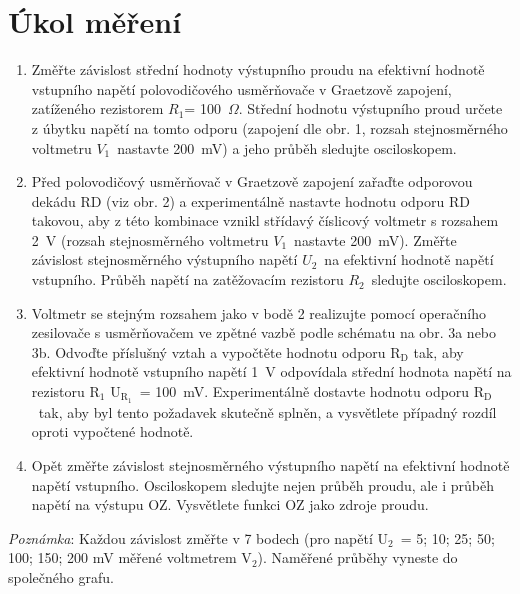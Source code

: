 \documentclass[a4paper,12pt]{article}   %
\newcommand{\tsub}[1]{$_\textrm{#1}$}
\newcommand{\tohm}{$\Omega$}
\newcommand{\ri}{$R_1$}
\newcommand{\rii}{$R_2$}
\newcommand{\uii}{$U_2$}
\newcommand{\vii}{$V_1$}
\begin{document}
\section{Úkol měření}
\label{zadani}
\begin{enumerate}
    \item Změřte závislost střední hodnoty výstupního proudu na efektivní hodnotě vstupního napětí polovodičového usměrňovače v Graetzově zapojení, zatíženého rezistorem \ri = 100~\tohm. Střední hodnotu výstupního proud určete z úbytku napětí na tomto odporu (zapojení dle obr. 1, rozsah stejnosměrného voltmetru \vii~nastavte 200~mV) a jeho průběh sledujte osciloskopem.
    \item Před polovodičový usměrňovač v Graetzově zapojení zařaďte odporovou dekádu RD (viz obr. 2) a experimentálně nastavte hodnotu odporu RD takovou, aby z této kombinace vznikl střídavý číslicový voltmetr s rozsahem 2~V (rozsah stejnosměrného voltmetru \vii~nastavte 200~mV). Změřte závislost stejnosměrného výstupního napětí \uii~na efektivní hodnotě napětí vstupního. Průběh napětí na zatěžovacím rezistoru \rii~sledujte osciloskopem.
    \item Voltmetr se stejným rozsahem jako v bodě 2 realizujte pomocí operačního zesilovače s usměrňovačem ve zpětné vazbě podle schématu na obr. 3a nebo 3b. Odvoďte příslušný vztah a vypočtěte hodnotu odporu R\tsub{D} tak, aby efektivní hodnotě vstupního napětí 1~V odpovídala střední hodnota napětí na rezistoru R\tsub{1} U\tsub{R\tsub{1}}~= 100~mV. Experimentálně dostavte hodnotu odporu R\tsub{D}~tak, aby byl tento požadavek skutečně splněn, a vysvětlete případný rozdíl oproti vypočtené hodnotě.
    \item Opět změřte závislost stejnosměrného výstupního napětí na efektivní hodnotě napětí vstupního. Osciloskopem sledujte nejen průběh proudu, ale i průběh napětí na výstupu OZ. Vysvětlete funkci OZ jako zdroje proudu.
\end{enumerate}
\textit{Poznámka}: Každou závislost změřte v 7 bodech (pro napětí U\tsub{2}~= 5; 10; 25; 50; 100; 150; 200 mV měřené voltmetrem V\tsub{2}). Naměřené průběhy vyneste do společného grafu.
\end{document}

